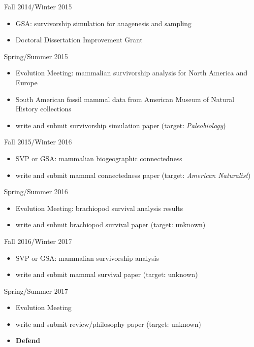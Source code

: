 \documentclass[12pt,letterpaper]{article}
\begin{document}
Fall 2014/Winter 2015
\begin{itemize}
  \item GSA: survivorship simulation for anagenesis and sampling
  \item Doctoral Dissertation Improvement Grant
\end{itemize}

Spring/Summer 2015
\begin{itemize}
  \item Evolution Meeting: mammalian survivorship analysis for North America and Europe
  \item South American fossil mammal data from American Museum of Natural History collections
  \item write and submit survivorship simulation paper (target: \textit{Paleobiology})
\end{itemize}

Fall 2015/Winter 2016
\begin{itemize}
  \item SVP or GSA: mammalian biogeographic connectedness
  \item write and submit mammal connectedness paper (target: \textit{American Naturalist})
\end{itemize}

Spring/Summer 2016
\begin{itemize}
  \item Evolution Meeting: brachiopod survival analysis results
  \item write and submit brachiopod survival paper (target: unknown)
\end{itemize}

Fall 2016/Winter 2017
\begin{itemize}
  \item SVP or GSA: mammalian survivorship analysis
  \item write and submit mammal survival paper (target: unknown)
\end{itemize}

Spring/Summer 2017
\begin{itemize}
  \item Evolution Meeting
  \item write and submit review/philosophy paper (target: unknown)
  \item \textbf{Defend}
\end{itemize}



\clearpage


\end{document}

